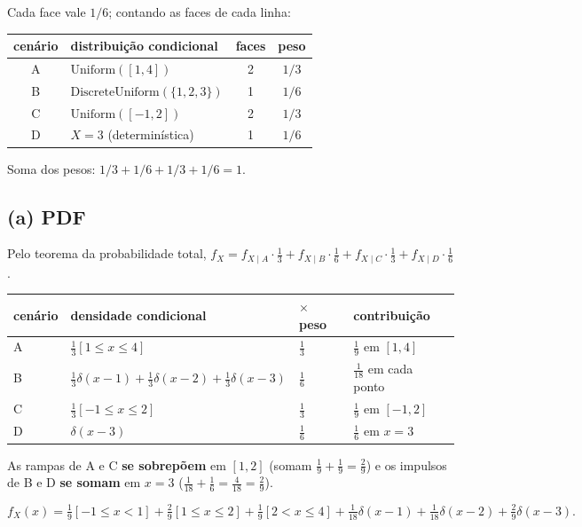 \documentclass[11pt,a4paper]{article}
\newcommand{\Ind}[1]{\left[#1\right]}
\begin{document}
Cada face vale $1/6$; contando as faces de cada linha:

\begin{center}
\begin{tabular}{clcc}
\toprule
cenário & distribuição condicional & faces & peso \\
\midrule
A & $\text{Uniform}([1,4])$ & 2 & $1/3$ \\
B & $\text{DiscreteUniform}(\{1,2,3\})$ & 1 & $1/6$ \\
C & $\text{Uniform}([-1,2])$ & 2 & $1/3$ \\
D & $X=3$ (determinística) & 1 & $1/6$ \\
\bottomrule
\end{tabular}
\end{center}

Soma dos pesos: $1/3+1/6+1/3+1/6=1$. \checkmark

\subsection*{(a) PDF}

Pelo teorema da probabilidade total,
$f_X = f_{X\mid A}\cdot\tfrac13 + f_{X\mid B}\cdot\tfrac16
      + f_{X\mid C}\cdot\tfrac13 + f_{X\mid D}\cdot\tfrac16$.

\begin{center}
\begin{tabular}{llll}
\toprule
cenário & densidade condicional & $\times$ peso & contribuição \\
\midrule
A & $\tfrac13\Ind{1\le x\le 4}$ & $\tfrac13$ & $\tfrac19$ em $[1,4]$ \\[2pt]
B & $\tfrac13\delta(x-1)+\tfrac13\delta(x-2)+\tfrac13\delta(x-3)$ & $\tfrac16$
  & $\tfrac1{18}$ em cada ponto \\[2pt]
C & $\tfrac13\Ind{-1\le x\le 2}$ & $\tfrac13$ & $\tfrac19$ em $[-1,2]$ \\[2pt]
D & $\delta(x-3)$ & $\tfrac16$ & $\tfrac16$ em $x=3$ \\
\bottomrule
\end{tabular}
\end{center}

As rampas de A e C \textbf{se sobrepõem} em $[1,2]$ (somam $\tfrac19+\tfrac19=\tfrac29$)
e os impulsos de B e D \textbf{se somam} em $x=3$
($\tfrac1{18}+\tfrac16=\tfrac{4}{18}=\tfrac29$).

\begin{resp}
\[
f_X(x)=\tfrac19\Ind{-1\le x<1}+\tfrac29\Ind{1\le x\le 2}+\tfrac19\Ind{2<x\le 4}
+\tfrac1{18}\delta(x-1)+\tfrac1{18}\delta(x-2)+\tfrac29\delta(x-3).
\]
\end{resp}
\end{document}

